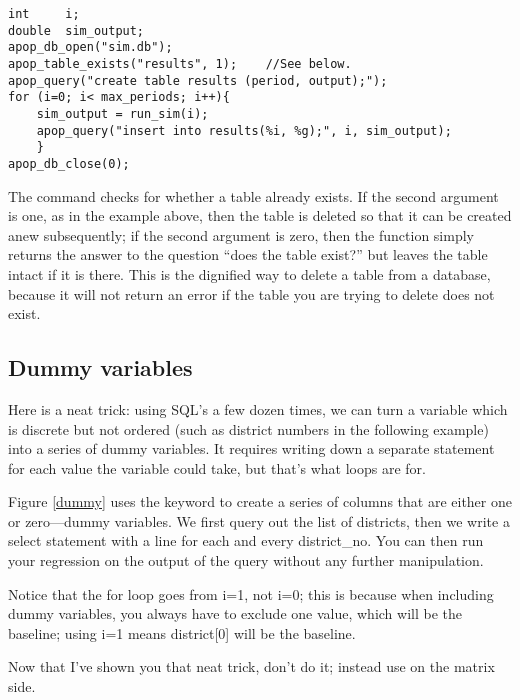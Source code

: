 \begin{lstlisting}
int     i;
double  sim_output;
apop_db_open("sim.db");
apop_table_exists("results", 1);    //See below.
apop_query("create table results (period, output);");
for (i=0; i< max_periods; i++){
    sim_output = run_sim(i);
    apop_query("insert into results(%i, %g);", i, sim_output);
    }
apop_db_close(0);
\end{lstlisting}

The  command checks for whether a table
already exists. If the second argument is one, as in the example above,
then the table is deleted so that it can be created anew subsequently;
if the second argument is zero, then the function simply returns the
answer to the question ``does the table exist?'' but leaves the table
intact if it is there. This is the dignified way to delete a table from
a database, because it will not return an error if the table you are
trying to delete does not exist.

\subsection{Dummy variables}
Here is a neat trick: using SQL's  a few dozen times, we can turn a
variable which is discrete but not ordered (such as district numbers in the
following example) into a series of dummy variables. It requires writing down a
separate  statement for each value the variable could take, but that's
what  loops are for.


Figure \ref{dummy} uses the  keyword to create a series of
columns that are either one or zero---dummy variables.
We first query out the list of districts, then we write a
select statement with a line  for
each and every district\_no. You can then run your regression on the output of the
query without any further manipulation.

Notice that the for loop goes from i=1, not i=0; this is because when including
dummy variables, you always have to exclude one value, which will be the baseline;
using i=1 means district[0] will be the baseline.

Now that I've shown you that neat trick, don't do it; instead use
 on the matrix side.


